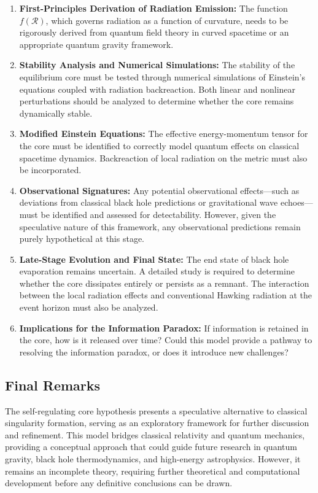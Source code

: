 \begin{enumerate}
    \item \textbf{First-Principles Derivation of Radiation Emission:} The function \( f(\mathcal{R}) \), which governs radiation as a function of curvature, needs to be rigorously derived from quantum field theory in curved spacetime or an appropriate quantum gravity framework.
    
    \item \textbf{Stability Analysis and Numerical Simulations:} The stability of the equilibrium core must be tested through numerical simulations of Einstein's equations coupled with radiation backreaction. Both linear and nonlinear perturbations should be analyzed to determine whether the core remains dynamically stable.

    \item \textbf{Modified Einstein Equations:} The effective energy-momentum tensor for the core must be identified to correctly model quantum effects on classical spacetime dynamics. Backreaction of local radiation on the metric must also be incorporated.
    
    \item \textbf{Observational Signatures:} Any potential observational effects—such as deviations from classical black hole predictions or gravitational wave echoes—must be identified and assessed for detectability. However, given the speculative nature of this framework, any observational predictions remain purely hypothetical at this stage.
    
    \item \textbf{Late-Stage Evolution and Final State:} The end state of black hole evaporation remains uncertain. A detailed study is required to determine whether the core dissipates entirely or persists as a remnant. The interaction between the local radiation effects and conventional Hawking radiation at the event horizon must also be analyzed.
    
    \item \textbf{Implications for the Information Paradox:} If information is retained in the core, how is it released over time? Could this model provide a pathway to resolving the information paradox, or does it introduce new challenges?
\end{enumerate}

\subsection{Final Remarks}
The self-regulating core hypothesis presents a speculative alternative to classical singularity formation, serving as an exploratory framework for further discussion and refinement. This model bridges classical relativity and quantum mechanics, providing a conceptual approach that could guide future research in quantum gravity, black hole thermodynamics, and high-energy astrophysics. However, it remains an incomplete theory, requiring further theoretical and computational development before any definitive conclusions can be drawn.

